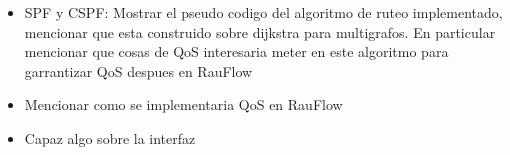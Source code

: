 \begin{itemize}
\item SPF y CSPF: Mostrar el pseudo codigo del algoritmo de ruteo implementado, mencionar que esta construido sobre dijkstra para multigrafos. En particular mencionar que cosas de QoS interesaria meter en este algoritmo para garrantizar QoS despues en RauFlow

\item Mencionar como se implementaria QoS en RauFlow

\item Capaz algo sobre la interfaz 
\end{itemize}